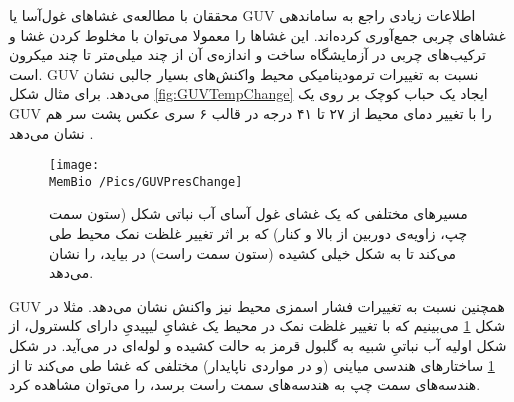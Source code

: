 محققان با مطالعه‌ی غشا‌های غول‌آسا
 یا 
 GUV اطلاعات  زیادی راجع به ساماندهی غشاهای چربی جمع‌آوری کرده‌اند. این غشا‌ها را معمولا می‌توان با  مخلوط کردن 
 غشا‌ و ترکیب‌های چربی در آزمایشگاه ساخت
 \cite{GUVmaking2009}
و اندازه‌ی آن  از چند میلی‌متر تا چند میکرون  است. 
GUV نسبت به تغییرات ترمودینامیکی محیط واکنش‌های بسیار جالبی نشان می‌دهد. برای مثال شکل
\ref{fig:GUVTempChange}
ایجاد یک حباب کوچک بر روی یک GUV را با تغییر دمای محیط از ۲۷ تا ۴۱ درجه در قالب ۶ سری عکس پشت سر هم نشان می‌دهد
\cite{MemReviewRamakrishnan2014}.
 
\begin{figure}[h]
\begin{center}
\texttt{[image: \\MemBio /Pics/GUVPresChange]}
\caption{
مسیر‌های مختلفی که یک غشای غول آسای آب نباتی شکل (ستون سمت چپ، زاویه‌ی دوربین از بالا و کنار) که بر اثر تغییر غلظت نمک محیط طی می‌کند تا به شکل خیلی کشیده (ستون سمت راست) در بیاید، را نشان می‌دهد.
}
\label{fig:GUVPresChange}
\end{center}
\end{figure}

GUV همچنین نسبت به تغییرات فشار اسمزی محیط نیز واکنش نشان می‌دهد. مثلا در شکل 
\ref{fig:GUVPresChange}
می‌بینیم که با تغییر غلظت نمک در محیط یک غشایِ لیپیدیِ دارای کلسترول، از شکل اولیه آب نباتیِ 
شبیه‌ به گلبول قرمز به حالت کشیده و لوله‌ای در می‌آید. در شکل 
\ref{fig:GUVPresChange}
ساختار‌های هندسی میاینی (و در مواردی ناپایدار) مختلفی که غشا طی می‌کند تا از هندسه‌های سمت چپ به هندسه‌های سمت راست برسد، را می‌توان مشاهده کرد.
  
 
 
 
 
 
 
 
 
 
 